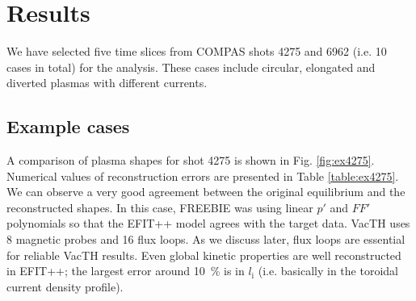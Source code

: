 
\section{Results} %
\label{sec:results}

We have selected five time slices from COMPAS shots 4275 and 6962 (i.e. 10 cases in total) for the analysis. These cases include circular, elongated and diverted plasmas with different currents. 

\subsection{Example cases}

A comparison of plasma shapes for shot 4275 is shown in Fig. \ref{fig:ex4275}. Numerical values of reconstruction errors are presented in Table \ref{table:ex4275}. We can observe a very good agreement between the original equilibrium and the reconstructed shapes. In this case, FREEBIE was using linear $p'$ and $FF'$ polynomials so that the EFIT++ model agrees with the target data. VacTH uses 8 magnetic probes and 16 flux loops. As we discuss later, flux loops are essential for reliable VacTH results. Even global kinetic properties are well reconstructed in EFIT++; the largest error around 10~\% is in $l_{\mathrm i}$ (i.e. basically in the toroidal current density profile).

